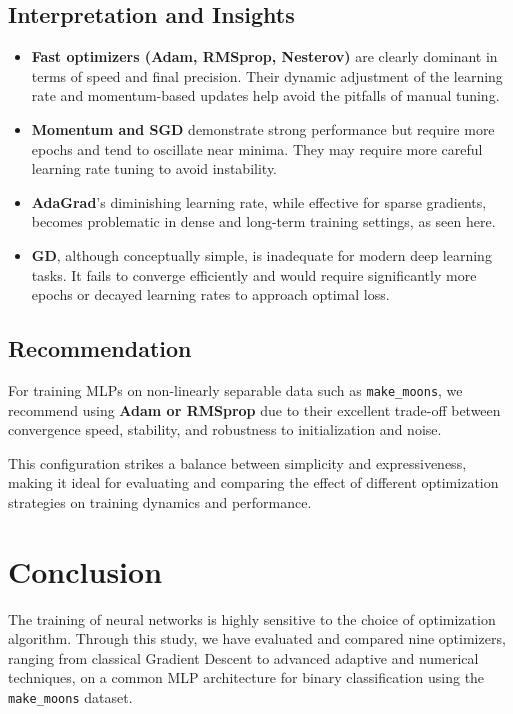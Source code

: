 \documentclass[12pt]{article}
\begin{document}
\subsection{Interpretation and Insights}

\begin{itemize}
    \item \textbf{Fast optimizers (Adam, RMSprop, Nesterov)} are clearly dominant in terms of speed and final precision. Their dynamic adjustment of the learning rate and momentum-based updates help avoid the pitfalls of manual tuning.
    
    \item \textbf{Momentum and SGD} demonstrate strong performance but require more epochs and tend to oscillate near minima. They may require more careful learning rate tuning to avoid instability.
    
    \item \textbf{AdaGrad}'s diminishing learning rate, while effective for sparse gradients, becomes problematic in dense and long-term training settings, as seen here.
    
    \item \textbf{GD}, although conceptually simple, is inadequate for modern deep learning tasks. It fails to converge efficiently and would require significantly more epochs or decayed learning rates to approach optimal loss.
\end{itemize}

\subsection{Recommendation}

For training MLPs on non-linearly separable data such as \texttt{make\_moons}, we recommend using \textbf{Adam or RMSprop} due to their excellent trade-off between convergence speed, stability, and robustness to initialization and noise.

This configuration strikes a balance between simplicity and expressiveness, making it ideal for evaluating and comparing the effect of different optimization strategies on training dynamics and performance.


\section{Conclusion}

The training of neural networks is highly sensitive to the choice of optimization algorithm. Through this study, we have evaluated and compared nine optimizers, ranging from classical Gradient Descent to advanced adaptive and numerical techniques, on a common MLP architecture for binary classification using the \texttt{make\_moons} dataset.
\end{document}
